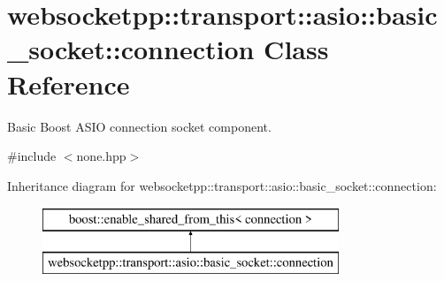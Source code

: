 \hypertarget{classwebsocketpp_1_1transport_1_1asio_1_1basic__socket_1_1connection}{}\section{websocketpp\+:\+:transport\+:\+:asio\+:\+:basic\+\_\+socket\+:\+:connection Class Reference}
\label{classwebsocketpp_1_1transport_1_1asio_1_1basic__socket_1_1connection}


Basic Boost A\+S\+IO connection socket component.  




{\ttfamily \#include $<$none.\+hpp$>$}

Inheritance diagram for websocketpp\+:\+:transport\+:\+:asio\+:\+:basic\+\_\+socket\+:\+:connection\+:\begin{figure}[H]
\begin{center}
\leavevmode
\includegraphics[height=2.000000cm]{classwebsocketpp_1_1transport_1_1asio_1_1basic__socket_1_1connection}
\end{center}
\end{figure}
